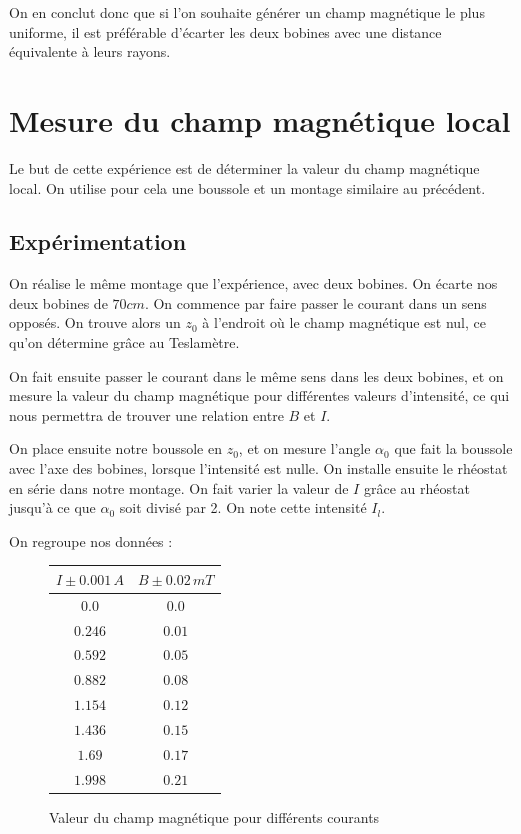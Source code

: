 \documentclass[12pt]{article}
\begin{document}
On en conclut donc que si l'on souhaite générer un champ magnétique le plus uniforme, il est préférable d'écarter les deux bobines avec une distance équivalente à leurs rayons.

\newpage

\section{Mesure du champ magnétique local}

Le but de cette expérience est de déterminer la valeur du champ magnétique local. On utilise pour cela une boussole et un montage similaire au précédent. 

\subsection{Expérimentation}
On réalise le même montage que l'expérience, avec deux bobines. On écarte nos deux bobines de $70cm$. On commence par faire passer le courant dans un sens opposés. On trouve alors un $z_0$ à l'endroit où le champ magnétique est nul, ce qu'on détermine grâce au Teslamètre. 

On fait ensuite passer le courant dans le même sens dans les deux bobines, et on mesure la valeur du champ magnétique pour différentes valeurs d'intensité, ce qui nous permettra de trouver une relation entre $B$ et $I$. 

On place ensuite notre boussole en $z_0$, et on mesure l'angle $\alpha_0$ que fait la boussole avec l'axe des bobines, lorsque l'intensité est nulle. On installe ensuite le rhéostat en série dans notre montage. On fait varier la valeur de $I$ grâce au rhéostat jusqu'à ce que $\alpha_0$ soit divisé par 2. On note cette intensité $I_l$. 

On regroupe nos données : 
\begin{figure}[!h]
	\begin{center}
		\begin{tabular}{|c|c|}
		\hline
		$I\pm 0.001 \, A$ & $B\pm 0.02\, mT$ \\
		\hline
	$0.0$ & $0.0$ \\ 
$0.246$ & $0.01$ \\ 
$0.592$ & $0.05$ \\ 
$0.882$ & $0.08$ \\ 
$1.154$ & $0.12$ \\ 
$1.436$ & $0.15$ \\ 
$1.69$ & $0.17$ \\ 
$1.998$ & $0.21$ \\ 
	\hline	
		\end{tabular}
	\end{center}
	\label{RelationIB}
	\caption{Valeur du champ magnétique pour différents courants}
\end{figure}
\end{document}
